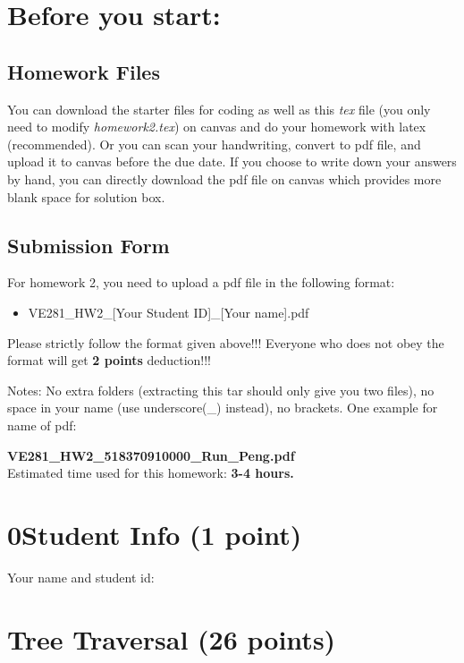 \documentclass[11pt]{exam}
\begin{document}
\setlength{\parindent}{0pt}
\section*{Before you start:}

\subsection*{Homework Files}
You can download the starter files for coding as well as this \textit{tex} file (you only need to modify \textit{homework2.tex}) on canvas and do your homework with latex (recommended). Or you can scan your handwriting, convert to pdf file, and upload it to canvas before the due date. If you choose to write down your answers by hand, you can directly download the pdf file on canvas which provides more blank space for solution box.\\

\subsection*{Submission Form}
For homework 2, you need to upload a pdf file in the following format:
\begin{itemize}
\item VE281\_HW2\_[Your Student ID]\_[Your name].pdf

\end{itemize}
{\color{red}Please strictly follow the format given above!!! Everyone who does not obey the format will get \textbf{2 points} deduction!!!}

Notes: No extra folders (extracting this tar should only give you two files), no space in your name (use underscore(\_) instead), no brackets. One example for name of pdf:

\textbf{VE281\_HW2\_518370910000\_Run\_Peng.pdf}\\

Estimated time used for this homework: \textbf{3-4 hours.}

\newpage
\section*{0\quad Student Info (1 point)}
Your name and student id:
\begin{solution}
\end{solution}

\section{Tree Traversal (26 points)}
\end{document}
